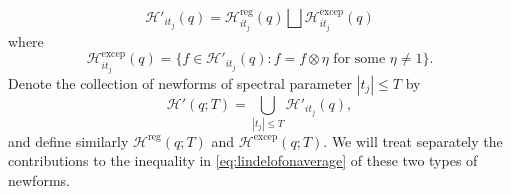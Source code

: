 \documentclass{article}
\theoremstyle{named}
\newcommand{\HH}{\mathcal{H}}
\begin{document}
\begin{equation*}
    \HH'_{it_j}(q) = \HH^{\text{reg}}_{it_j}(q) \bigsqcup \HH^{\text{excep}}_{it_j}(q)
\end{equation*}
where
\begin{equation*}
    \HH^{\text{excep}}_{it_j}(q) = \{f \in \HH'_{it_j}(q) : f  = f\otimes \eta\text{ for some } \eta \neq 1\}.
\end{equation*}
Denote the collection of newforms of spectral parameter $|t_j|\leq T$ by
\begin{equation*}
    \HH'(q; T) = \bigcup_{|t_j| \leq T} \HH'_{it_j}(q),
\end{equation*}
and define similarly $\HH^{\text{reg}}(q; T)$ and $\HH^{\text{excep}}(q; T)$. We will treat separately the contributions to the inequality in \eqref{eq:lindelofonaverage} of these two types of newforms.
\end{document}
